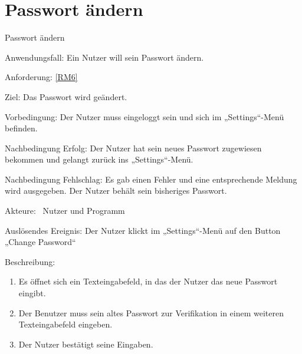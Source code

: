 \section{Passwort \"andern}
\begin{function}{60}{Passwort ändern}
\item[Anwendungsfall:] Ein Nutzer will sein Passwort ändern.
\item[Anforderung:] \ref{RM6}
\item[Ziel:] Das Passwort wird geändert.
\item[Vorbedingung:] Der Nutzer muss eingeloggt sein und sich im „Settings“-Menü befinden.
\item[Nachbedingung Erfolg:]  Der Nutzer hat sein neues Passwort zugewiesen bekommen und gelangt zurück ins „Settings“-Menü.
\item[Nachbedingung Fehlschlag:] Es gab einen Fehler und eine entsprechende Meldung wird ausgegeben. Der Nutzer behält sein bisheriges Passwort.
\item[Akteure:] ~Nutzer und Programm
\item[Auslösendes Ereignis:] Der Nutzer klickt im „Settings“-Menü auf den Button „Change Password“
\item[Beschreibung:] ~
\begin{enumerate}
  \item  Es öffnet sich ein Texteingabefeld, in das der Nutzer das neue Passwort eingibt.
  \item  Der Benutzer muss sein altes Passwort zur Verifikation in einem weiteren Texteingabefeld eingeben.
  \item Der Nutzer bestätigt seine Eingaben.
\end{enumerate}
\end{function}

